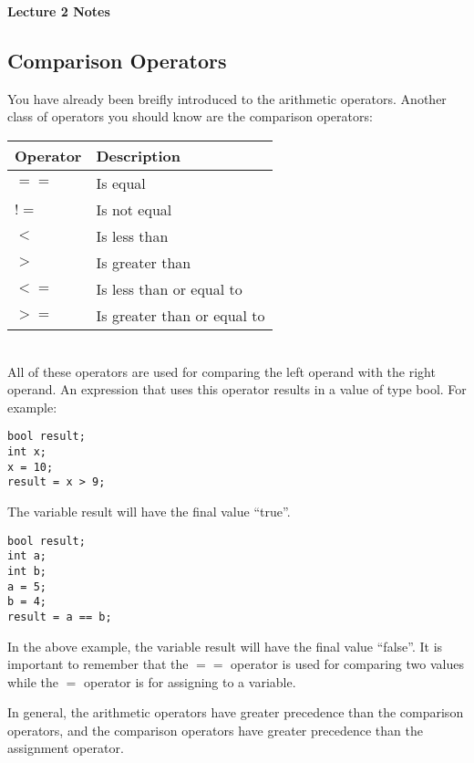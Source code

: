 \documentclass[a4paper,12pt]{article}
\begin{document}
\lstset{frame=single,tabsize=4,basicstyle=\ttfamily}

{\centering \bf \Large
Lecture 2 Notes \\[\baselineskip]
}

\subsection*{Comparison Operators}

You have already been breifly introduced to the arithmetic operators. Another class of operators you should know are the comparison operators: \\

\begin{tabular}{|l|l|}
\hline
Operator & Description \\ 
\hline
$==$ & Is equal \\
\hline
$!=$ & Is not equal \\
\hline
$<$ & Is less than \\
\hline
$>$ & Is greater than \\
\hline
$<=$ & Is less than or equal to \\
\hline
$>=$ & Is greater than or equal to \\
\hline
\end{tabular} \\

All of these operators are used for comparing the left operand with the right operand. An expression that uses this operator results in a value of type bool. For example:

\begin{lstlisting}
bool result;
int x;
x = 10;
result = x > 9;
\end{lstlisting}

The variable result will have the final value ``true''. 

\begin{lstlisting}
bool result;
int a;
int b;
a = 5;
b = 4;
result = a == b;
\end{lstlisting}

In the above example, the variable result will have the final value ``false''. It is important to remember that the $==$ operator is used for comparing two values while the $=$ operator is for assigning to a variable.

In general, the arithmetic operators have greater precedence than the comparison operators, and the comparison operators have greater precedence than the assignment operator.
\end{document}
